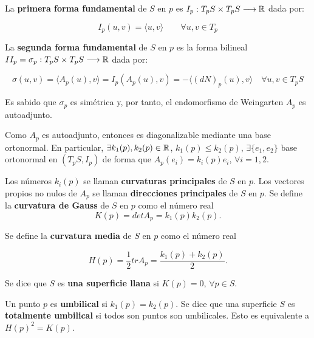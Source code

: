 \begin{definition}
La \textbf{primera forma fundamental} de $S$ en $p$ es $I_p: T_pS \times T_pS \longrightarrow \mathbb{R}$ dada por: 

\begin{equation*}
    I_p(u,v) =  \langle u,v \rangle \qquad \forall u,v \in T_p
\end{equation*}

La \textbf{segunda forma fundamental} de $S$ en $p$ es la forma bilineal $II_p = \sigma_p: T_pS \times T_pS \longrightarrow \mathbb{R}$ dada por: 

\begin{equation*}
    \sigma(u,v) = \langle A_p(u),v \rangle  = I_p(A_p(u),v) = - \langle (dN)_p(u), v \rangle \quad \forall u,v \in T_pS
\end{equation*}

\end{definition}

Es sabido que $\sigma_p$ es simétrica y, por tanto, el endomorfismo de Weingarten $A_p$ es autoadjunto.

Como $A_p$ es autoadjunto, entonces es diagonalizable mediante una base ortonormal. En particular, $\exists k_1(p), k_2(p) \in \mathbb{R}$, $k_1(p) \leq k_2(p)$, $\exists \{e_1,e_2\}$ base ortonormal en $(T_pS, I_p)$ de forma que $A_p(e_i) = k_i(p)e_i$, $\forall i = 1,2$.

Los números $k_i(p)$ se llaman \textbf{curvaturas principales} de $S$ en $p$.
Los vectores propios no nulos de $A_p$ se llaman \textbf{direcciones principales} de $S$ en $p$.
Se define la \textbf{curvatura de Gauss} de $S$ en $p$ como el número real 
%
\begin{equation*}
    K(p)=det A_p=k_1(p)k_2(p).
\end{equation*}

Se define la \textbf{curvatura media} de $S$ en $p$ como el número real 

\begin{equation*}
    H(p)=\frac{1}{2}tr A_p=\frac{k_1(p)+k_2(p)}{2}.
\end{equation*}

Se dice que $S$ es \textbf{una superficie llana} si $K(p)=0$, $\forall p \in S$.

\begin{definition}
Un punto $p$ es \textbf{umbilical} si $k_1(p)=k_2(p)$.
Se dice que una superficie $S$ es \textbf{totalmente umbilical} si todos son puntos son umbilicales. Esto es equivalente a $H(p)^2=K(p)$.
\end{definition}

